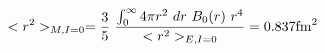 \begin{equation}
<r^2>_{M,I=0}  = \frac{3}{5}~ \frac{\int_0^\infty 4 \pi r^2~dr~B_0(r)~r^4}{<r^2>_{E,I=0} }=0.837 {\rm fm}^2
\end{equation}

